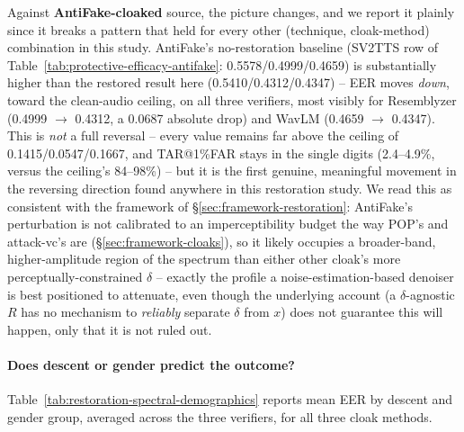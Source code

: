 \documentclass[11pt]{article}
\begin{document}
Against \textbf{AntiFake-cloaked} source, the picture changes, and we
report it plainly since it breaks a pattern that held for every other
(technique, cloak-method) combination in this study. AntiFake's
no-restoration baseline (SV2TTS row of
Table~\ref{tab:protective-efficacy-antifake}: 0.5578/0.4999/0.4659) is
substantially higher than the restored result here
(0.5410/0.4312/0.4347) -- EER moves \emph{down}, toward the clean-audio
ceiling, on all three verifiers, most visibly for Resemblyzer (0.4999
$\to$ 0.4312, a 0.0687 absolute drop) and WavLM (0.4659 $\to$ 0.4347).
This is \emph{not} a full reversal -- every value remains far above the
ceiling of 0.1415/0.0547/0.1667, and TAR@1\%FAR stays in the single
digits (2.4--4.9\%, versus the ceiling's 84--98\%) -- but it is the
first genuine, meaningful movement in the reversing direction found
anywhere in this restoration study. We read this as consistent with
the framework of \S\ref{sec:framework-restoration}: AntiFake's
perturbation is not calibrated to an imperceptibility budget the way
POP's and attack-vc's are (\S\ref{sec:framework-cloaks}), so it likely
occupies a broader-band, higher-amplitude region of the spectrum than
either other cloak's more perceptually-constrained $\delta$ -- exactly
the profile a noise-estimation-based denoiser is best positioned to
attenuate, even though the underlying account (a $\delta$-agnostic $R$
has no mechanism to \emph{reliably} separate $\delta$ from $x$) does
not guarantee this will happen, only that it is not ruled out.

\paragraph{Does descent or gender predict the outcome?}
Table~\ref{tab:restoration-spectral-demographics} reports mean EER by
descent and gender group, averaged across the three verifiers, for all
three cloak methods.
\end{document}
